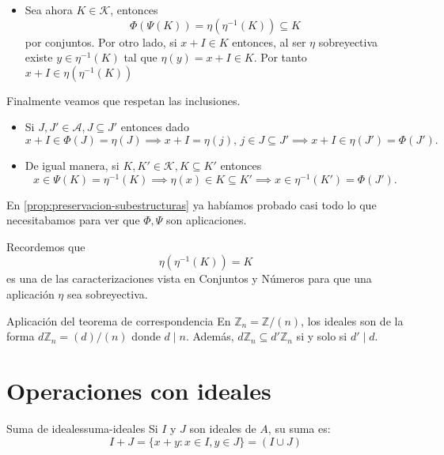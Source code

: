 \begin{proofbox}
\begin{itemize}
        \item Sea ahora $K \in \mathcal{K}$, entonces 
        \[
        \Phi(\Psi(K)) = \eta(\eta^{-1}(K)) \subseteq K
        \]
        por conjuntos. Por otro lado, si $x + I \in K$ entonces, al ser $\eta$ sobreyectiva existe $y \in \eta^{-1}(K)$ tal que $\eta(y) = x + I \in K$. Por tanto $x + I \in \eta(\eta^{-1}(K))$ 
    \end{itemize}

    Finalmente veamos que respetan las inclusiones.
    \begin{itemize}
        \item Si $J,J' \in \mathcal{A}, J \subseteq J'$ entonces dado
        \[
        x+I \in \Phi(J) = \eta(J) \implies x+I = \eta(j),\, j \in J \subseteq J' \implies x+I \in \eta(J') = \Phi(J').
        \]
        \item De igual manera, si $K, K' \in \mathcal{K}, K \subseteq K'$ entonces
        \[
        x \in \Psi(K) = \eta^{-1}(K) \implies \eta(x) \in K \subseteq K' \implies x \in \eta^{-1}(K') = \Phi(J').
        \]
    \end{itemize}
\end{proofbox}

\begin{remark}
    En \ref{prop:preservacion-subestructuras} ya habíamos probado casi todo lo que necesitabamos para ver que $\Phi, \Psi$ son aplicaciones.
\end{remark}

\begin{remark}
    Recordemos que
    \[
    \eta(\eta^{-1}(K)) = K
    \]
    es una de las caracterizaciones vista en Conjuntos y Números para que una aplicación $\eta$ sea sobreyectiva.
\end{remark}

\begin{example}{Aplicación del teorema de correspondencia}{}
    En \(\mathbb{Z}_n = \mathbb{Z}/(n)\), los ideales son de la forma \(d\mathbb{Z}_n = (d)/(n)\) donde \(d \mid n\). Además, \(d\mathbb{Z}_n \subseteq d'\mathbb{Z}_n\) si y solo si \(d' \mid d\).
\end{example}

\clearpage

\section{Operaciones con ideales}

\begin{definition}{Suma de ideales}{suma-ideales}
    Si \(I\) y \(J\) son ideales de \(A\), su {suma} es:
    \[
    I + J = \{x + y : x \in I, y \in J\} = (I \cup J)
    \]
\end{definition}

